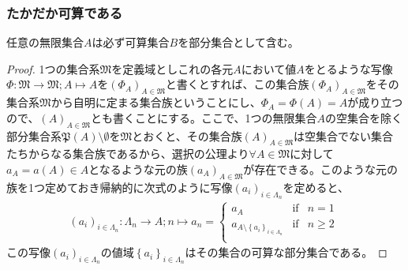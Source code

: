 \documentclass[dvipdfmx]{jsarticle}
\begin{document}
\subsubsection{たかだか可算である}%
\begin{thm}\label{1.2.7.6}
任意の無限集合$A$は必ず可算集合$B$を部分集合として含む。
\end{thm}
\begin{proof}
1つの集合系$\mathfrak{M}$を定義域としこれの各元$A$において値$A$をとるような写像$\varPhi:\mathfrak{M}\mathfrak{\rightarrow M};A \mapsto A$を$\left( \varPhi_{A} \right)_{A \in \mathfrak{M}}$と書くとすれば、この集合族$\left( \varPhi_{A} \right)_{A \in \mathfrak{M}}$をその集合系$\mathfrak{M}$から自明に定まる集合族ということにし、$\varPhi_{A} = \varPhi(A) = A$が成り立つので、$(A)_{A \in \mathfrak{M}}$とも書くことにする。ここで、1つの無限集合$A$の空集合を除く部分集合系$\mathfrak{P}(A) \setminus \emptyset$を$\mathfrak{M}$とおくと、その集合族$(A)_{A \in \mathfrak{M}}$は空集合でない集合たちからなる集合族であるから、選択の公理より$\forall A \in \mathfrak{M}$に対して$a_{A} = a(A) \in A$となるような元の族$\left( a_{A} \right)_{A \in \mathfrak{M}}$が存在できる。このような元の族を1つ定めておき帰納的に次式のように写像$\left( a_{i} \right)_{i \in \varLambda_{n}}$を定めると、
\begin{align*}
\left( a_{i} \right)_{i \in \varLambda_{n}}:\varLambda_{n} \rightarrow A;n \mapsto a_{n} = \left\{ \begin{matrix}
a_{A} & {\mathrm {if}} & n = 1 \\
a_{A \setminus \left\{ a_{i} \right\}_{i \in \varLambda_{n}}} & {\mathrm {if}} & n \geq 2 \\
\end{matrix} \right.\ 
\end{align*}
この写像$\left( a_{i} \right)_{i \in \varLambda_{n}}$の値域$\left\{ a_{i} \right\}_{i \in \varLambda_{n}}$はその集合の可算な部分集合である。
\end{proof}
\end{document}
